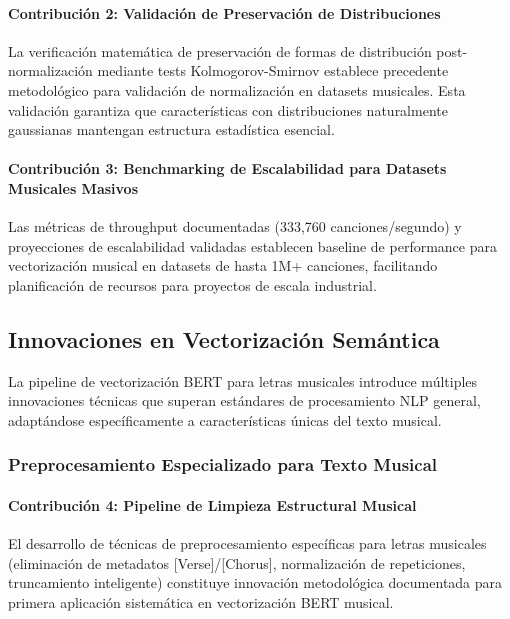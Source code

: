 \documentclass[12pt,a4paper]{report}
\begin{document}
\paragraph{Contribución 2: Validación de Preservación de Distribuciones}

La verificación matemática de preservación de formas de distribución post-normalización mediante tests Kolmogorov-Smirnov establece precedente metodológico para validación de normalización en datasets musicales. Esta validación garantiza que características con distribuciones naturalmente gaussianas mantengan estructura estadística esencial.

\paragraph{Contribución 3: Benchmarking de Escalabilidad para Datasets Musicales Masivos}

Las métricas de throughput documentadas (333,760 canciones/segundo) y proyecciones de escalabilidad validadas establecen baseline de performance para vectorización musical en datasets de hasta 1M+ canciones, facilitando planificación de recursos para proyectos de escala industrial.

\subsection{Innovaciones en Vectorización Semántica}

La pipeline de vectorización BERT para letras musicales introduce múltiples innovaciones técnicas que superan estándares de procesamiento NLP general, adaptándose específicamente a características únicas del texto musical.

\subsubsection{Preprocesamiento Especializado para Texto Musical}

\paragraph{Contribución 4: Pipeline de Limpieza Estructural Musical}

El desarrollo de técnicas de preprocesamiento específicas para letras musicales (eliminación de metadatos [Verse]/[Chorus], normalización de repeticiones, truncamiento inteligente) constituye innovación metodológica documentada para primera aplicación sistemática en vectorización BERT musical.
\end{document}
